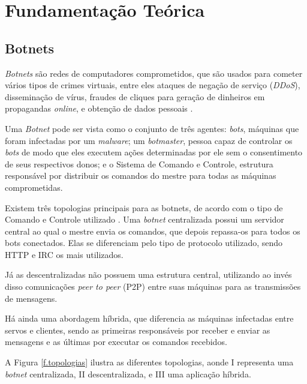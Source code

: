 \chapter{Fundamentação Teórica}
\label{c.fundamentacao}

\section{Botnets}

\textit{Botnets} são redes de computadores comprometidos, que são usados para cometer vários tipos de crimes virtuais, entre eles ataques de negação de serviço (\textit{DDoS}), disseminação de vírus, fraudes de cliques para geração de dinheiros em propagandas \textit{online}, e obtenção de dados pessoais \cite{ianelli2005botnets}.

Uma \textit{Botnet} pode ser vista como o conjunto de três agentes: \textit{bots}, máquinas que foram infectadas por um \textit{malware}; um \textit{botmaster}, pessoa capaz de controlar os \textit{bots} de modo que eles executem ações determinadas por ele sem o consentimento de seus respectivos donos; e o Sistema de Comando e Controle, estrutura responsável por distribuir os comandos do mestre para todas as máquinas comprometidas. \cite{miller2016role}

Existem três topologias principais para as botnets, de acordo com o tipo de Comando e Controle utilizado \cite{jang2009analysis}. Uma \textit{botnet} centralizada possui um servidor central ao qual o mestre envia os comandos, que depois repassa-os para todos os bots conectados. Elas se diferenciam pelo tipo de protocolo utilizado, sendo HTTP e IRC os mais utilizados.

Já as descentralizadas não possuem uma estrutura central, utilizando ao invés disso comunicações \textit{peer to peer} (P2P) entre suas máquinas para as transmissões de mensagens. 

Há ainda uma abordagem híbrida, que diferencia as máquinas infectadas entre servos e clientes, sendo as primeiras responsáveis por receber e enviar as mensagens e as últimas por executar os comandos recebidos. 

A Figura \ref{f.topologias} ilustra as diferentes topologias, aonde I representa uma \textit{botnet} centralizada, II descentralizada, e III uma aplicação híbrida.


